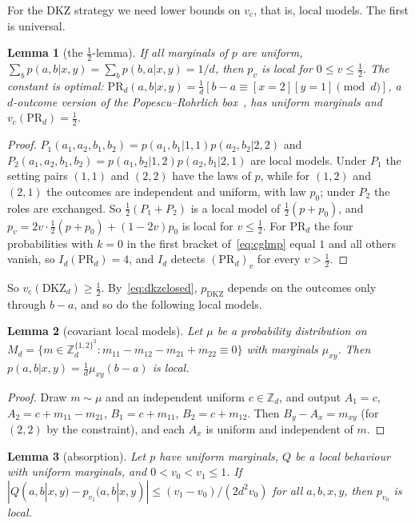 \documentclass[11pt]{article}
\newtheorem{lemma}{Lemma}[section]
\theoremstyle{remark}
\numberwithin{equation}{section}
\newcommand{\Z}{\mathbb{Z}}
\newcommand{\vc}{v_{\mathrm c}}
\newcommand{\DKZ}{\mathrm{DKZ}}
\begin{document}
For the DKZ strategy we need lower bounds on $\vc$, that is, local models. The first is universal.

\begin{lemma}[the $\frac12$-lemma]\label{lem:half}
If all marginals of $p$ are uniform, $\sum_bp(a,b|x,y)=\sum_bp(b,a|x,y)=1/d$, then $p_v$ is local for $0\le v\le\frac12$.
The constant is optimal: $\mathrm{PR}_d(a,b|x,y)=\frac1d[b-a\equiv[x=2][y=1]\pmod d]$, a $d$-outcome version of the
Popescu--Rohrlich box~\cite{PR}, has uniform marginals and $\vc(\mathrm{PR}_d)=\frac12$.
\end{lemma}

\begin{proof}
$P_1(a_1,a_2,b_1,b_2)=p(a_1,b_1|1,1)p(a_2,b_2|2,2)$ and $P_2(a_1,a_2,b_1,b_2)=p(a_1,b_2|1,2)p(a_2,b_1|2,1)$ are local models.
Under $P_1$ the setting pairs $(1,1)$ and $(2,2)$ have the laws of $p$, while for $(1,2)$ and $(2,1)$ the outcomes are
independent and uniform, with law $p_0$; under $P_2$ the roles are exchanged. So $\frac12(P_1+P_2)$ is a local model of
$\frac12(p+p_0)$, and $p_v=2v\cdot\frac12(p+p_0)+(1-2v)p_0$ is local for $v\le\frac12$. For $\mathrm{PR}_d$ the four
probabilities with $k=0$ in the first bracket of~\eqref{eq:cglmp} equal $1$ and all others vanish, so
$I_d(\mathrm{PR}_d)=4$, and $I_d$ detects $(\mathrm{PR}_d)_v$ for every $v>\frac12$.
\end{proof}

So $\vc(\DKZ_d)\ge\frac12$. By~\eqref{eq:dkzclosed}, $p_{\DKZ}$ depends on the outcomes only through $b-a$, and so do the
following local models.

\begin{lemma}[covariant local models]\label{lem:covariant}
Let $\mu$ be a probability distribution on $M_d=\{m\in\Z_d^{\{1,2\}^2}:m_{11}-m_{12}-m_{21}+m_{22}\equiv0\}$ with marginals
$\mu_{xy}$. Then $p(a,b|x,y)=\frac1d\mu_{xy}(b-a)$ is local.
\end{lemma}

\begin{proof}
Draw $m\sim\mu$ and an independent uniform $c\in\Z_d$, and output $A_1=c$, $A_2=c+m_{11}-m_{21}$, $B_1=c+m_{11}$,
$B_2=c+m_{12}$. Then $B_y-A_x=m_{xy}$ (for $(2,2)$ by the constraint), and each $A_x$ is uniform and independent of $m$.
\end{proof}

\begin{lemma}[absorption]\label{lem:absorb}
Let $p$ have uniform marginals, $Q$ be a local behaviour with uniform marginals, and $0<v_0<v_1\le1$. If
$|Q(a,b|x,y)-p_{v_1}(a,b|x,y)|\le(v_1-v_0)/(2d^2v_0)$ for all $a,b,x,y$, then $p_{v_0}$ is local.
\end{lemma}
\end{document}
